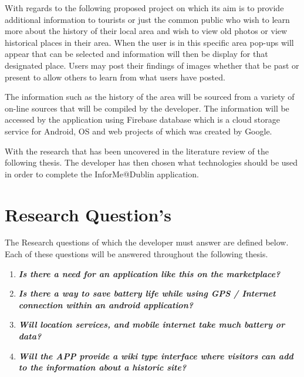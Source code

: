 With regards to the following proposed project on which its aim is to provide additional information to tourists or just the common public who wish to learn more about the history of their local area and wish to view old photos or view historical places in their area. When the user is in this specific area pop-ups will appear that can be selected and information will then be display for that designated place. Users may post their findings of images whether that be past or present to allow others to learn from what users have posted.
\par
The information such as the history of the area will be sourced from a variety of on-line sources that will be compiled by the developer. The information will be accessed by the application using Firebase database which is a cloud storage service for Android, OS and web projects of which was created by Google.
\par
With the research that has been uncovered in the literature review of the following thesis. The developer has then chosen what technologies should be used in order to complete the InforMe@Dublin application.

\section{Research Question's}
The Research questions of which the developer must answer are defined below. Each of these questions will be answered throughout the following thesis.
\begin{enumerate}
	\item\textbf{\textit{Is there a need for an application like this on the marketplace?}}

	\item\textbf{\textit{Is there a way to save battery life while using GPS / Internet connection within an android application?}}

	\item\textbf{\textit{Will location services, and mobile internet take much battery or data?}} 

	\item\textbf{\textit{Will the APP provide a wiki type interface where visitors can add to the information about a historic site?}}
	
\end{enumerate}    





